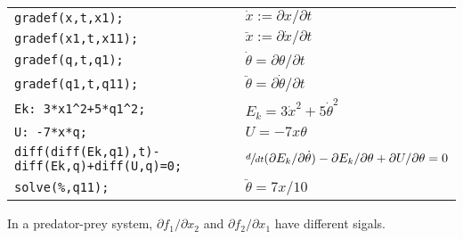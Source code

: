 \documentclass{form}
\begin{document}
\begin{center}
    \begin{tabular}{p{92mm} | p{92mm}}
        \texttt{gradef(x,t,x1);} & $\dot{x} := \partial x / \partial t$ \\
        \texttt{gradef(x1,t,x11);} & $\ddot{x} := \partial \dot{x} / \partial t$ \\
        \texttt{gradef(q,t,q1);} & $\dot{\theta} = \partial \theta / \partial t$ \\
        \texttt{gradef(q1,t,q11);} & $\ddot{\theta} = \partial \dot{\theta} / \partial t$ \\
        \texttt{Ek: 3*x1\^{}2+5*q1\^{}2;} & $E_k = 3 \dot{x}^2 + 5 \dot{\theta} ^2$ \\
        \texttt{U: -7*x*q;} & $U = -7x \theta$ \\
        \texttt{diff(diff(Ek,q1),t)-diff(Ek,q)+diff(U,q)=0;} & $\sfrac{d}{dt}(\partial E_k / \partial \dot{\theta}) - \partial E_k / \partial \theta + \partial U / \partial \theta=0$ \\
        \texttt{solve(\%,q11);} & $\ddot{\theta} = 7x/10$
    \end{tabular}
\end{center}
In a predator-prey system, $\partial f_1 / \partial x_2$ and $\partial f_2 / \partial x_1$ have different sigals.
\end{document}
